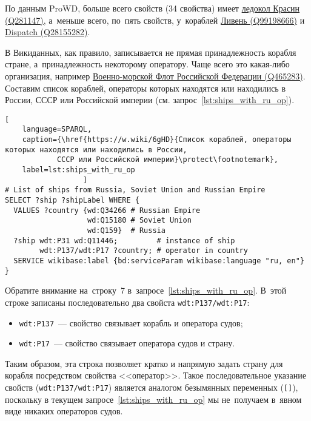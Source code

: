 \newpage
По данным ProWD, больше всего свойств (34 свойства) имеет 
\href{https://www.wikidata.org/wiki/Q281147}{ледокол Красин (Q281147)}, 
а~меньше всего, по~пять свойств, у~кораблей 
\href{https://www.wikidata.org/wiki/Q99198666}{Ливень (Q99198666)} и 
\href{https://www.wikidata.org/wiki/Q28155282}{Dispatch (Q28155282)}.

В Викиданных, как правило, записывается не прямая принадлежность корабля стране, 
а~принадлежность некоторому оператору. 
Чаще всего это какая-либо организация, 
например 
\href{https://www.wikidata.org/wiki/Q465283}{Военно-морской Флот Российской Федерации (Q465283)}. 
Составим список кораблей, 
операторы которых находятся или находились в России, СССР или Российской империи 
(см. запрос~\ref{lst:ships_with_ru_op}). 



\begin{lstlisting}[ 
    language=SPARQL, 
    caption={\href{https://w.wiki/6gHD}{Cписок кораблей, операторы которых находятся или находились в России, 
            СССР или Российской империи}\protect\footnotemark}, 
    label=lst:ships_with_ru_op 
                  ]
# List of ships from Russia, Soviet Union and Russian Empire
SELECT ?ship ?shipLabel WHERE {
  VALUES ?country {wd:Q34266 # Russian Empire
                   wd:Q15180 # Soviet Union
                   wd:Q159}  # Russia
  ?ship wdt:P31 wd:Q11446;         # instance of ship
        wdt:P137/wdt:P17 ?country; # operator in country
  SERVICE wikibase:label {bd:serviceParam wikibase:language "ru, en"}
}
\end{lstlisting}

Обратите внимание на~строку~7 в~запросе~\ref{lst:ships_with_ru_op}. 
В~этой строке записаны последовательно два свойста \texttt{wdt:P137/wdt:P17}:
\begin{itemize}
	\item \texttt{wdt:P137}~--- свойство  связывает корабль и оператора судов;
	\item \texttt{wdt:P17}~--- свойство  связывает оператора судов и страну.
\end{itemize}
Таким образом, эта строка позволяет кратко и напрямую задать страну для корабля 
посредством свойства <<оператор>>. 
Такое последовательное указание свойств (\texttt{wdt:P137/wdt:P17}) 
является аналогом безымянных переменных (\lstinline|[]|),
поскольку в текущем запросе~\ref{lst:ships_with_ru_op} 
мы не~получаем в~явном виде никаких операторов судов. 




